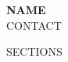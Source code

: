 \documentclass[10pt,letterpaper]{article}
\begin{document}
\begin{center}
  {\LARGE\textbf{{{NAME}}}}\\[5pt]
  {{CONTACT}}
\end{center}

{{SECTIONS}}
\end{document}
